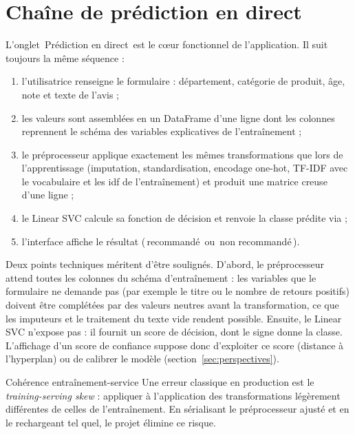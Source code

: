 \documentclass[11pt,a4paper]{report}
\makeatletter
\def\og{\guillemotleft\nobreak\,}%
\def\fg{\unskip\nobreak\,\guillemotright}%
\newcommand{\gl}[1]{\og #1\fg{}}       %
\numberwithin{equation}{chapter}
\DeclareRobustCommand{\code}[1]{{\ttfamily\fontsize{\strip@pt\dimexpr\f@size pt*9/10\relax}{\f@baselineskip}\selectfont\detokenize{#1}}}
\makeatother
\begin{document}
\section{Chaîne de prédiction en direct}
L'onglet \gl{Prédiction en direct} est le c\oe ur fonctionnel de l'application. Il suit toujours la même séquence :
\begin{enumerate}
\item l'utilisatrice renseigne le formulaire : département, catégorie de produit, âge, note et texte de l'avis ;
\item les valeurs sont assemblées en un DataFrame d'une ligne dont les colonnes reprennent le schéma des variables explicatives de l'entraînement ;
\item le préprocesseur applique exactement les mêmes transformations que lors de l'apprentissage (imputation, standardisation, encodage one-hot, TF-IDF avec le vocabulaire et les idf de l'entraînement) et produit une matrice creuse d'une ligne ;
\item le Linear SVC calcule sa fonction de décision et renvoie la classe prédite via \code{model.predict()} ;
\item l'interface affiche le résultat (\gl{recommandé} ou \gl{non recommandé}).
\end{enumerate}
Deux points techniques méritent d'être soulignés. D'abord, le préprocesseur attend toutes les colonnes du schéma d'entraînement : les variables que le formulaire ne demande pas (par exemple le titre ou le nombre de retours positifs) doivent être complétées par des valeurs neutres avant la transformation, ce que les imputeurs et le traitement du texte vide rendent possible. Ensuite, le Linear SVC n'expose pas \code{predict_proba} : il fournit un score de décision, dont le signe donne la classe. L'affichage d'un score de confiance suppose donc d'exploiter ce score (distance à l'hyperplan) ou de calibrer le modèle (section~\ref{sec:perspectives}).

\begin{calloutnote}{Cohérence entraînement-service}
Une erreur classique en production est le \textit{training-serving skew} : appliquer à l'application des transformations légèrement différentes de celles de l'entraînement. En sérialisant le préprocesseur ajusté et en le rechargeant tel quel, le projet élimine ce risque.
\end{calloutnote}
\end{document}
